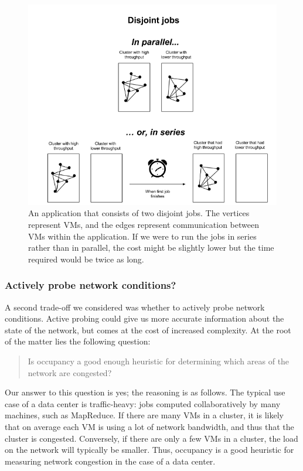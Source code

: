 \documentclass[11pt]{article}
\begin{document}
\begin{figure}[h]
  \centering
\includegraphics[scale=0.65]{disjointjobs.png}

 \caption{An application that consists of two disjoint jobs.  The vertices represent VMs, and the edges represent communication between VMs within the application.  If we were to run the jobs in series rather than in parallel, the cost might be slightly lower but the time required would be twice as long.}

 \label{fig:disjoint-jobs}
\end{figure}


\subsubsection{Actively probe network conditions?}

A second trade-off we considered was whether to actively probe network conditions.  Active probing could give us more accurate information about the state of the network, but comes at the cost of increased complexity.  At the root of the matter lies the following question:

\begin{quote}
Is occupancy a good enough heuristic for determining which areas of the network are congested?
\end{quote}

Our answer to this question is yes; the reasoning is as follows.  The typical use case of a data center is traffic-heavy: jobs computed collaboratively by many machines, such as MapReduce.  If there are many VMs in a cluster, it is likely that on average each VM is using a lot of network bandwidth, and thus that the cluster is congested.  Conversely, if there are only a few VMs in a cluster, the load on the network will typically be smaller.  Thus, occupancy is a good heuristic for measuring network congestion in the case of a data center.
\end{document}
